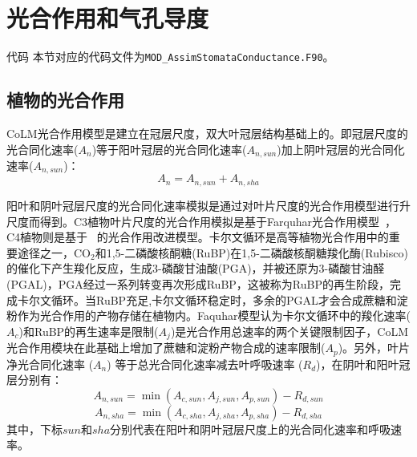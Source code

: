 \chapter{光合作用和气孔导度}
\begin{mymdframed}{代码}
本节对应的代码文件为\texttt{MOD\_AssimStomataConductance.F90}。
\end{mymdframed}


\section{植物的光合作用}\label{植物的光合作用}
CoLM光合作用模型是建立在冠层尺度，双大叶冠层结构基础上的。即冠层尺度的光合同化速率($A_{n}$)等于阳叶冠层的光合同化速率($A_{n,sun}$)加上阴叶冠层的光合同化速率($A_{n,sun}$)：
\begin{equation}\label{Ansun_Ansha}
A_{n}=A_{n,sun}+A_{n,sha}
\end{equation}

阳叶和阴叶冠层尺度的光合同化速率模拟是通过对叶片尺度的光合作用模型进行升尺度而得到。C3植物叶片尺度的光合作用模拟是基于Farquhar光合作用模型~\citep{farquhar1980biochemical}，
C4植物则是基于~\citet{collatz1992} 的光合作用改进模型。卡尔文循环是高等植物光合作用中的重要途径之一，CO$_2$和1,5-二磷酸核酮糖(RuBP)在1,5-二磷酸核酮糖羧化酶(Rubisco)的催化下产生羧化反应，生成3-磷酸甘油酸(PGA)，并被还原为3-磷酸甘油醛(PGAL)，PGA经过一系列转变再次形成RuBP，这被称为RuBP的再生阶段，完成卡尔文循环。当RuBP充足,卡尔文循环稳定时，多余的PGAL才会合成蔗糖和淀粉作为光合作用的产物存储在植物内。Faquhar模型认为卡尔文循环中的羧化速率($A_{c}$)和RuBP的再生速率是限制($A_{j}$)是光合作用总速率的两个关键限制因子，CoLM光合作用模块在此基础上增加了蔗糖和淀粉产物合成的速率限制($A_{p}$)。另外，叶片净光合同化速率 ($A_{n}$) 等于总光合同化速率减去叶呼吸速率 ($R_d$)，在阴叶和阳叶冠层分别有：
\begin{equation}\label{An1sun}
A_{n,sun}=\min \left(A_{c,sun}, A_{j,sun}, A_{p,sun}\right)-R_{d,sun}
\end{equation}
\begin{equation}\label{An1sha}
A_{n,sha}=\min \left(A_{c,sha}, A_{j,sha}, A_{p,sha}\right)-R_{d,sha}
\end{equation}
其中，下标$sun$和$sha$分别代表在阳叶和阴叶冠层尺度上的光合同化速率和呼吸速率。


